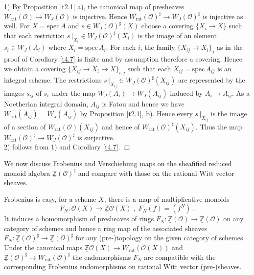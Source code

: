 \documentclass[12pt,leqno]{article}
\newcommand{\Z}{{\mathbb{Z}}}
\newcommand{\uZ}{\underline{\Z}}
\newcommand{\spec}{\mathrm{spec}\,}
\newcommand{\rat}{\mathrm{rat}}
\newcommand{\Oh}{{\mathcal O}}
\newenvironment{proof}{\noindent {\bf Proof}}{\mbox{}\hspace*{\fill}$\Box$}
\begin{document}
\begin{proof}
1) By Proposition \ref{t2.1} a), the canonical map of presheaves $W_{\rat} (\Oh) \to W_J (\Oh)$ is injective. Hence $W_{\rat} (\Oh)^{\sharp} \to W_J (\Oh)^{\sharp}$ is injective as well. For $X = \spec A$ and $s \in W_J (\Oh)^{\sharp} (X)$ choose a covering $\{ X_i \to X \}$ such that each restriction $s \, |_{X_i} \in W_J (\Oh)^{\sharp} (X_i)$ is the image of an element $s_i \in W_J (A_i)$ where $X_i = \spec A_i$. For each $i$, the family $\{ X_{ij} \to X_i \}_j$ as in the proof of Corollary \ref{t4.7} is finite and by assumption therefore a covering. Hence we obtain a covering $\{ X_{ij} \to X_i \to X \}_{i,j}$ such that each $X_{ij} = \spec A_{ij}$ is an integral scheme. The restrictions $s \, |_{X_{ij}} \in W_J (\Oh)^{\sharp} (X_{ij})$ are represented by the images $s_{ij}$ of $s_i$ under the map $W_J (A_i) \to W_J (A_{ij})$ induced by $A_i \to A_{ij}$. As a Noetherian integral domain, $A_{ij}$ is Fatou and hence we have $W_{\rat} (A_{ij}) = W_J (A_{ij})$ by Proposition \ref{t2.1}, b). Hence every $s \, |_{X_{ij}}$ is the image of a section of $W_{\rat} (\Oh) (X_{ij})$ and hence of $W_{\rat} (\Oh)^{\sharp} (X_{ij})$. Thus the map $W_{\rat} (\Oh)^{\sharp} \to W_J (\Oh)^{\sharp}$ is surjective.\\
2) follows from 1) and Corollary \ref{t4.7}. 
\end{proof}

We now discuss Frobenius and Verschiebung maps on the sheafified reduced monoid algebra $\uZ (\Oh)^{\sharp}$ and compare with those on the rational Witt vector sheaves.

Frobenius is easy, for a scheme $X$, there is a map of multiplicative monoids
\[
F_N : \Oh (X) \longrightarrow \uZ \Oh (X) \; , \; F_N (f) = (f^N) \; .
\]
It induces a homomorphism of presheaves of rings $F_N : \uZ (\Oh) \to \uZ (\Oh)$ on any category of schemes and hence a ring map of the associated sheaves $F_N : \uZ (\Oh)^{\sharp} \to \uZ (\Oh)^{\sharp}$ for any (pre-)topology on the given category of schemes. Under the canonical maps $\uZ \Oh (X) \to W_{\rat} (\Oh (X))$ and $\uZ (\Oh)^{\sharp} \to W_{\rat} (\Oh)^{\sharp}$ the endomorphisms $F_N$ are compatible with the corresponding Frobenius endomorphisms on rational Witt vector (pre-)sheaves. 
\end{document}
